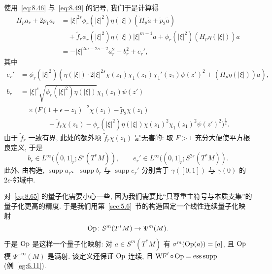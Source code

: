 使用~\eqref{eq:8.46} 与~\eqref{eq:8.49} 的记号, 我们于是计算得
\begin{equation}\label{eq:8.64}
    \begin{aligned}
        H_p a_r + 2 p_1 a_r
        &= | \xi |^{2s}\phi_r(| \xi |^2)\eta(| \xi |)\left( \tilde{H}_p\tilde{a} + \tilde{p}_2\tilde{a} \right) \\
        &\quad + \tilde{f}_r\phi_r(| \xi |^2)\eta(| \xi |)| \xi |^{m-1}a + \phi_r(| \xi |^2)\left( H_p\eta(| \xi |) \right)a \\
        &= -| \xi |^{2m-2s-2}a_r^2 - b_r^2 + e_r',
    \end{aligned}
\end{equation}
其中
\begin{equation}\label{eq:8.65}
    \begin{aligned}
        e_r' &= \phi_r(| \xi |^2)\left( \eta(| \xi |) \cdot 2| \xi |^{2s}\chi(z_1)\chi_1(z_1)\chi_1'(z_1)\psi(z')^2 + (H_p\eta(| \xi |))a \right), \\
        b_r &= | \xi |^{s}\sqrt{\phi_r(| \xi |^2)\eta(| \xi |)}\chi_1(z_1)\psi(z') \\
        &\quad \times \Big( F(1 + \epsilon - z_1)^{-2}\chi(z_1) - \tilde{p}_2\chi(z_1) \\
        &\qquad\qquad - \tilde{f}_r\chi(z_1) - \phi_r(| \xi |^2)\eta(| \xi |)\chi(z_1)^2\chi_1(z_1)^2\psi(z')^2 \Big)^{\frac{1}{2}}.
    \end{aligned}
\end{equation}
由于 $\tilde{f}_r$ 一致有界, 此处的额外项 $\tilde{f}_r\chi(z_1)$ 是无害的: 取 $F > 1$ 充分大便使平方根良定义, 于是
\begin{equation}\label{eq:8.66}
    b_r \in L^\infty((0, 1]_r; S^s(T^*M)), \qquad e_r' \in L^\infty((0, 1]_r; S^{2s}(T^*M)).
\end{equation}
此外, 由构造, $\operatorname{supp}a_r$、$\operatorname{supp}b_r$ 与 $\operatorname{supp}e_r'$ 分别含于 $\gamma([0, 1])$ 与 $\gamma(0)$ 的 $2\epsilon$-邻域中.

对~\eqref{eq:8.65} 的量子化需要小心一些, 因为我们需要比``只尊重主符号与本质支集''的量子化更高的精度. 于是我们用第~\ref{sec:5.6}~节的构造固定一个线性连续量子化映射
\begin{equation}\label{eq:8.67}
    \operatorname{Op} \colon S^m(T^*M) \to \Psi^m(M).
\end{equation}
于是 $\operatorname{Op}$ 是这样一个量子化映射: 对 $a \in S^m(T^*M)$ 有 $\sigma^m(\operatorname{Op}(a)) = [a]$, 且 $\operatorname{Op}$ 模 $\Psi^{-\infty}(M)$ 是满射. 该定义还保证 $\operatorname{Op}$ 连续, 且 $\operatorname{WF}' \circ \operatorname{Op} = \operatorname{ess\,supp}$ (例~\ref{eg:6.11}).

